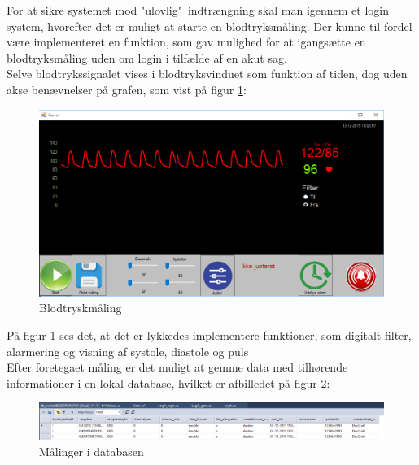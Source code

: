For at sikre systemet mod "ulovlig"\ indtrængning skal man igennem et login system, hvorefter det er muligt at starte en blodtryksmåling. Der kunne til fordel være implementeret en funktion, som gav mulighed for at igangsætte en blodtryksmåling uden om login i tilfælde af en akut sag.\\ 
Selve blodtrykssignalet vises i blodtryksvinduet som funktion af tiden, dog uden akse benævnelser på grafen, som vist på figur \ref{blodtryk}:

\begin{figure}[H]
	\centering
	\includegraphics[width=1\textwidth]{Figurer/SoftwareImplementering/blodtryk}
	\caption{Blodtryskmåling}
	\label{blodtryk}
\end{figure}

På figur \ref{blodtryk} ses det, at det er lykkedes implementere funktioner, som digitalt filter, alarmering og visning af systole, diastole og puls\\
Efter foretegaet måling er det muligt at gemme data med tilhørende informationer i en lokal database, hvilket er afbilledet på figur \ref{databasegem}:

\begin{figure}[H]
	\centering
	\includegraphics[width=1.1\textwidth]{Figurer/SoftwareImplementering/databasegem}
	\caption{Målinger i databasen}
	\label{databasegem}
\end{figure}

